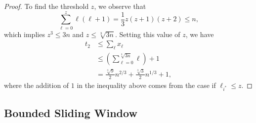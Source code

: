 \begin{proof}
To find the threshold $z$, we observe that
\[\sum_{\ell=0}^z \ell(\ell+1) = \frac{1}{3}z(z+1)(z+2)\leq n,\]
which implies $z^3\leq 3n$ and $z\leq\sqrt[3]{3n}$. Setting this value of $z$, we have
\begin{align*}
    t_2 &\leq \sum_\ell x_\ell \\
    &\leq \left(\sum_{\ell=0}^{\sqrt[3]{3n}} \ell\right) + 1\\
    &= \frac{\sqrt[3]{9}}{2} n^{2/3} + \frac{\sqrt[3]{3}}{2} n^{1/3} + 1,
\end{align*}
where the addition of $1$ in the inequality above comes from the case if $\ell_{i^*}\leq z$.
\end{proof}

\subsection{Bounded Sliding Window}

\begin{reminderclaim}{}
    \newconstraint
\end{reminderclaim}

